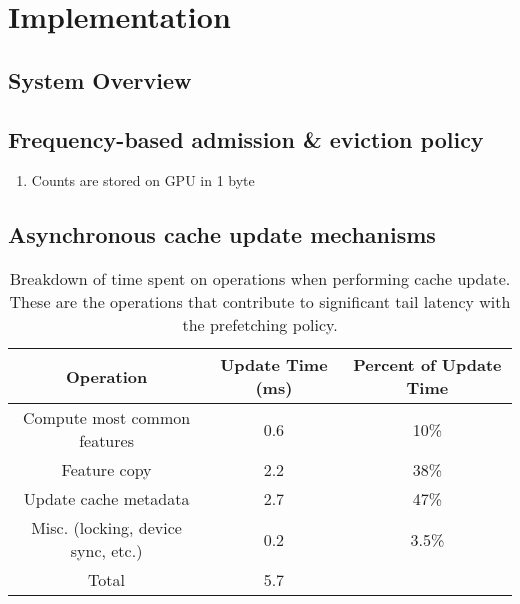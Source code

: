 \chapter{Implementation}

\section{System Overview}

\section{Frequency-based admission \& eviction policy}

\begin{enumerate}
    \item Counts are stored on GPU in 1 byte
\end{enumerate}

\section{Asynchronous cache update mechanisms}

\begin{table}[h]
    \begin{center}
        \begin{tabular}{|c c c|} 
        \hline
        \textbf{Operation} & \textbf{Update Time (ms)} & \textbf{Percent of Update Time} \\ [0.5ex] 
        \hline\hline
        Compute most common features & 0.6 & 10\% \\
        \hline
        Feature copy & 2.2 & 38\% \\
        \hline
        Update cache metadata & 2.7 & 47\%  \\
        \hline
        Misc. (locking, device sync, etc.) & 0.2 & 3.5\% \\
        \hline
        Total & 5.7 & \\
        \hline
        \end{tabular}
    \end{center}
    \caption{Breakdown of time spent on operations when performing cache update.
    These are the operations that contribute to significant tail latency with the prefetching policy.
    }
\end{table}


